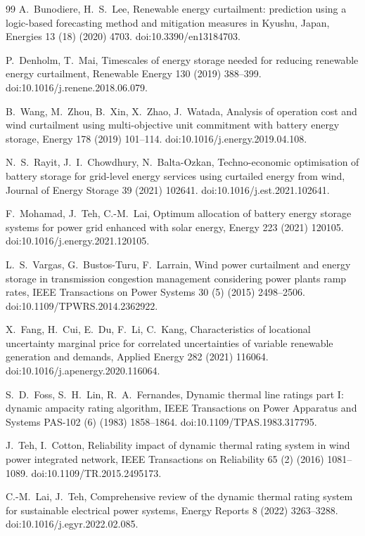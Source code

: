 \documentclass[preprint,3p,times]{elsarticle}
\providecommand{\DIFaddtex}[1]{{\protect\color{blue} \sf #1}} %
\providecommand{\DIFadd}[1]{\texorpdfstring{\DIFaddtex{#1}}{#1}} %
\begin{document}
\begin{thebibliography}{99}
\DIFadd{A.~Bunodiere, H.~S.~Lee,
Renewable energy curtailment: prediction using a logic-based forecasting method and mitigation measures in Kyushu, Japan,
Energies 13 (18) (2020) 4703.
doi:10.3390/en13184703.
}

\DIFadd{P.~Denholm, T.~Mai,
Timescales of energy storage needed for reducing renewable energy curtailment,
Renewable Energy 130 (2019) 388--399.
doi:10.1016/j.renene.2018.06.079.
}

\DIFadd{B.~Wang, M.~Zhou, B.~Xin, X.~Zhao, J.~Watada,
Analysis of operation cost and wind curtailment using multi-objective unit commitment with battery energy storage,
Energy 178 (2019) 101--114.
doi:10.1016/j.energy.2019.04.108.
}

\DIFadd{N.~S.~Rayit, J.~I.~Chowdhury, N.~Balta-Ozkan,
Techno-economic optimisation of battery storage for grid-level energy services using curtailed energy from wind,
Journal of Energy Storage 39 (2021) 102641.
doi:10.1016/j.est.2021.102641.
}

\DIFadd{F.~Mohamad, J.~Teh, C.-M.~Lai,
Optimum allocation of battery energy storage systems for power grid enhanced with solar energy,
Energy 223 (2021) 120105.
doi:10.1016/j.energy.2021.120105.
}

\DIFadd{L.~S.~Vargas, G.~Bustos-Turu, F.~Larrain,
Wind power curtailment and energy storage in transmission congestion management considering power plants ramp rates,
IEEE Transactions on Power Systems 30 (5) (2015) 2498--2506.
doi:10.1109/TPWRS.2014.2362922.
}

\DIFadd{X.~Fang, H.~Cui, E.~Du, F.~Li, C.~Kang,
Characteristics of locational uncertainty marginal price for correlated uncertainties of variable renewable generation and demands,
Applied Energy 282 (2021) 116064.
doi:10.1016/j.apenergy.2020.116064.
}

\DIFadd{S.~D.~Foss, S.~H.~Lin, R.~A.~Fernandes,
Dynamic thermal line ratings part I: dynamic ampacity rating algorithm,
IEEE Transactions on Power Apparatus and Systems PAS-102 (6) (1983) 1858--1864.
doi:10.1109/TPAS.1983.317795.
}

\DIFadd{J.~Teh, I.~Cotton,
Reliability impact of dynamic thermal rating system in wind power integrated network,
IEEE Transactions on Reliability 65 (2) (2016) 1081--1089.
doi:10.1109/TR.2015.2495173.
}

\DIFadd{C.-M.~Lai, J.~Teh,
Comprehensive review of the dynamic thermal rating system for sustainable electrical power systems,
Energy Reports 8 (2022) 3263--3288.
doi:10.1016/j.egyr.2022.02.085.
}


\end{thebibliography}
\end{document}

